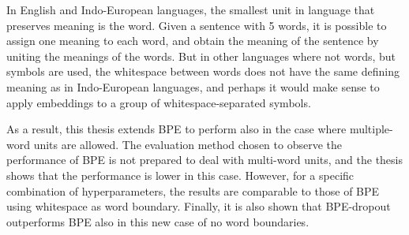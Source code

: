 In English and Indo-European languages, the smallest unit in language that preserves meaning is the word. Given a sentence with 5 words, it is possible to assign one meaning to each word, and obtain the meaning of the sentence by uniting the meanings of the words. But in other languages where not words, but symbols are used, the whitespace between words does not have the same defining meaning as in Indo-European languages, and perhaps it would make sense to apply embeddings to a group of whitespace-separated symbols.

As a result, this thesis extends BPE to perform also in the case where multiple-word units are allowed. The evaluation method chosen to observe the performance of BPE is not prepared to deal with multi-word units, and the thesis shows that the performance is lower in this case. However, for a specific combination of hyperparameters, the results are comparable to those of BPE using whitespace as word boundary. Finally, it is also shown that BPE-dropout outperforms BPE also in this new case of no word boundaries.
